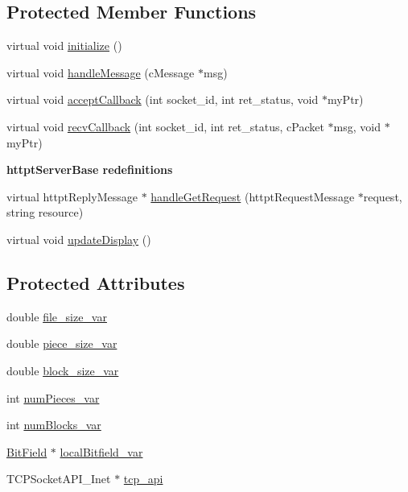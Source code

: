 \subsection*{Protected Member Functions}
\begin{DoxyCompactItemize}
\item 
virtual void \hyperlink{classHttpVideoServer_a3127ef997a71295b1f6de5550958471c}{initialize} ()
\item 
virtual void \hyperlink{classHttpVideoServer_ada12e18a6a9441c9d6e6ed4d342ef152}{handle\+Message} (c\+Message $\ast$msg)
\item 
virtual void \hyperlink{classHttpVideoServer_a2dc6f992b9415e07df68d88671b644c3}{accept\+Callback} (int socket\+\_\+id, int ret\+\_\+status, void $\ast$my\+Ptr)
\item 
virtual void \hyperlink{classHttpVideoServer_aded1f1456e066d10b8d973d9c40e211c}{recv\+Callback} (int socket\+\_\+id, int ret\+\_\+status, c\+Packet $\ast$msg, void $\ast$my\+Ptr)
\end{DoxyCompactItemize}
\begin{Indent}{\bf httpt\+Server\+Base redefinitions}\par
\begin{DoxyCompactItemize}
\item 
virtual httpt\+Reply\+Message $\ast$ \hyperlink{classHttpVideoServer_acfd022e0c52ecbf11ce85dad3e7cd970}{handle\+Get\+Request} (httpt\+Request\+Message $\ast$request, string resource)
\item 
virtual void \hyperlink{classHttpVideoServer_aa127b68d76ece8f70f78350c93f62516}{update\+Display} ()
\end{DoxyCompactItemize}
\end{Indent}
\subsection*{Protected Attributes}
\begin{DoxyCompactItemize}
\item 
double \hyperlink{classHttpVideoServer_af45336d8522d6f0a882c04ea4cc4301e}{file\+\_\+size\+\_\+var}
\item 
double \hyperlink{classHttpVideoServer_a6cb1c220cced89e22cb6b945013adecb}{piece\+\_\+size\+\_\+var}
\item 
double \hyperlink{classHttpVideoServer_adf1a02001ad6ab37a3f0728df6bcb618}{block\+\_\+size\+\_\+var}
\item 
int \hyperlink{classHttpVideoServer_ae630ec3629f6a4e00a7a28e583395ee2}{num\+Pieces\+\_\+var}
\item 
int \hyperlink{classHttpVideoServer_a39d06af889c6ae735c472bd5a04d5fc5}{num\+Blocks\+\_\+var}
\item 
\hyperlink{classBitField}{Bit\+Field} $\ast$ \hyperlink{classHttpVideoServer_a8686906ce2ad0b0226567bcb0386e4f8}{local\+Bitfield\+\_\+var}
\item 
T\+C\+P\+Socket\+A\+P\+I\+\_\+\+Inet $\ast$ \hyperlink{classHttpVideoServer_ab30327bad9fa9a59dad39b759f9e83c0}{tcp\+\_\+api}
\end{DoxyCompactItemize}


